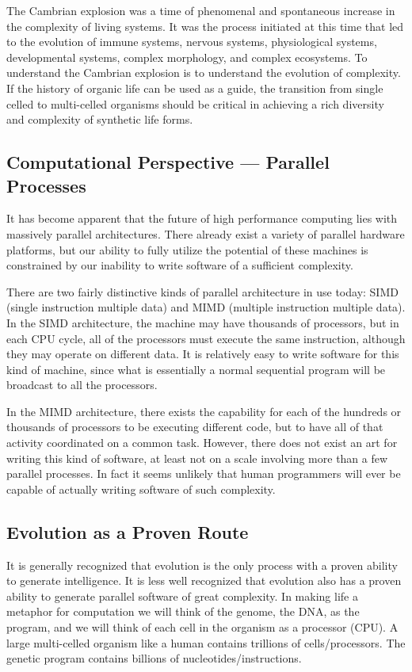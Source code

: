 The Cambrian explosion was a time of phenomenal and spontaneous increase
in the complexity of living systems.  It was the process initiated at
this time that led to the evolution of immune systems, nervous systems,
physiological systems, developmental systems, complex morphology, and
complex ecosystems.  To understand the Cambrian explosion is to understand
the evolution of complexity.  If the history of organic life can be used
as a guide, the transition from single celled to multi-celled organisms
should be critical in achieving a rich diversity and complexity
of synthetic life forms.

\subsection{Computational Perspective --- Parallel Processes}

It has become apparent that the future of high performance computing
lies with massively parallel architectures.  There already exist a
variety of parallel hardware platforms, but our ability to fully
utilize the potential of these machines is constrained by our
inability to write software of a sufficient complexity.

There are two fairly distinctive kinds of parallel architecture in
use today: SIMD (single instruction multiple data) and MIMD (multiple
instruction multiple data).  In the SIMD architecture, the machine may
have thousands of processors, but in each CPU cycle, all of the processors
must execute the same instruction, although they may operate on different
data.  It is relatively easy to write software for this kind of machine,
since what is essentially a normal sequential program will be broadcast to
all the processors.

In the MIMD architecture, there exists the capability for each of the
hundreds or thousands of processors to be executing different code, but
to have all of that activity coordinated on a common task.  However, there
does not exist an art for writing this kind of software, at least not
on a scale involving more than a few parallel processes.  In fact it
seems unlikely that human programmers will ever be capable of actually
writing software of such complexity.

\subsection{Evolution as a Proven Route}

It is generally recognized that evolution is the only process with
a proven ability to generate intelligence.  It is less well recognized
that evolution also has a proven ability to generate parallel software
of great complexity.  In making life a metaphor for computation we
will think of the genome, the DNA, as the program, and we will think
of each cell in the organism as a processor (CPU).  A large multi-celled
organism like a human contains trillions of cells/processors.  The
genetic program contains billions of nucleotides/instructions.

